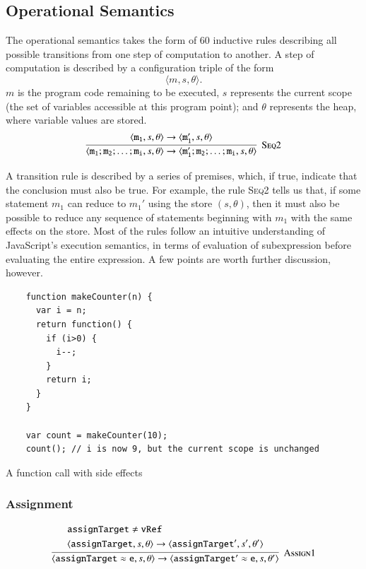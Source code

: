 \documentclass[12pt,a4paper,twoside,openright]{report}
\theoremstyle{definition}
\theoremstyle{dotless}
\begin{document}
\subsection{Operational Semantics}
The operational semantics takes the form of {\color{red}60} inductive rules
describing all possible transitions from one step of computation to another. A
step of computation is described by a configuration triple of the form
$$\langle m, s, \theta\rangle.$$ $m$ is the program code remaining to be
executed, $s$ represents the current scope (the set of variables accessible at
this program point); and $\theta$ represents the heap, where variable values
are stored.
$$\infer[\textsc{Seq2}]
{\langle \mathtt{m_1; m_2; \dots; m_i}, s, \theta\rangle \rightarrow \langle \mathtt{m_1'; m_2; \dots; m_i}, s, \theta\rangle}
{\langle\mathtt{m_1}, s, \theta\rangle\rightarrow\langle \mathtt{m_1'},s, \theta\rangle}$$

A transition rule is described by a series of premises, which, if true,
indicate that the conclusion must also be true. For example, the rule
\textsc{Seq2} tells us that, if some statement $m_1$ can reduce to $m_1'$ using
the store $(s,\theta)$, then it must also be possible to reduce any sequence of
statements beginning with $m_1$ with the same effects on the store. Most of the
rules follow an intuitive understanding of JavaScript's execution semantics, in
terms of evaluation of subexpression before evaluating the entire expression. A
few points are worth further discussion, however.

\begin{program}[t]
  \begin{verbatim}
	function makeCounter(n) {
	  var i = n;
	  return function() {
		if (i>0) {
		  i--;
		}
		return i;
	  }
	}

	var count = makeCounter(10);
	count(); // i is now 9, but the current scope is unchanged
  \end{verbatim}
  \caption{A function call with side effects}\label{lst:sideEffects}
\end{program}

\subsubsection*{Assignment}

$$\infer[\textsc{Assign1}]
{
  \langle \mathtt{assignTarget \approx e}, s, \theta \rangle \rightarrow
  \langle \mathtt{assignTarget' \approx e}, s, \theta' \rangle
}
{
  \begin{split}
  	&\mathtt{assignTarget} \not = \mathtt{vRef} \\
  	&\langle \mathtt{assignTarget}, s, \theta \rangle \rightarrow
	\langle \mathtt{assignTarget'}, s', \theta'\rangle
  \end{split}
}$$
\end{document}
